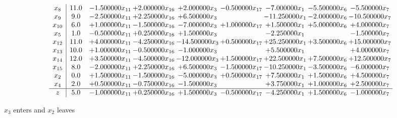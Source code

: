 \documentclass[10pt]{article}
\begin{document}
 \[\begin{array}{c| c c@{\hskip 2pt} c@{\hskip 2pt} c@{\hskip 2pt} c@{\hskip 2pt} c@{\hskip 2pt} c@{\hskip 2pt} c@{\hskip 2pt} }
 x_{8}   &  11.0 & -1.500000 x_{11} & + 2.000000 x_{16} & + 2.000000 x_{3} & -0.500000 x_{17} & -7.000000 x_{1} & -5.500000 x_{6} & -5.500000 x_{7}\\
 x_{9}   &  9.0 & -2.500000 x_{11} & + 2.250000 x_{16} & + 6.500000 x_{3} &   & -11.250000 x_{1} & -2.000000 x_{6} & -10.500000 x_{7}\\
 x_{10}   &  6.0 & + 1.000000 x_{11} & -1.500000 x_{16} & -7.000000 x_{3} & + 1.000000 x_{17} & + 1.500000 x_{1} & + 5.000000 x_{6} & + 4.000000 x_{7}\\
 x_{5}   &  1.0 & -0.500000 x_{11} & + 0.250000 x_{16} & + 1.500000 x_{3} &   & -2.250000 x_{1} &   & -1.500000 x_{7}\\
 x_{12}   &  11.0 & + 4.000000 x_{11} & -4.250000 x_{16} & -14.500000 x_{3} & + 0.500000 x_{17} & + 25.250000 x_{1} & + 3.500000 x_{6} & + 15.000000 x_{7}\\
 x_{13}   &  10.0 & + 1.000000 x_{11} & -0.500000 x_{16} & -1.000000 x_{3} &   & + 5.500000 x_{1} &   & + 4.000000 x_{7}\\
 x_{14}   &  12.0 & + 3.500000 x_{11} & -4.500000 x_{16} & -12.000000 x_{3} & + 1.500000 x_{17} & + 22.500000 x_{1} & + 7.500000 x_{6} & + 12.500000 x_{7}\\
 x_{15}   &  8.0 & -2.000000 x_{11} & + 2.250000 x_{16} & + 6.500000 x_{3} & -1.500000 x_{17} & -10.250000 x_{1} & -3.500000 x_{6} & -6.000000 x_{7}\\
 x_{2}   &  0.0 & + 1.500000 x_{11} & -1.500000 x_{16} & -5.000000 x_{3} & + 0.500000 x_{17} & + 7.500000 x_{1} & + 1.500000 x_{6} & + 4.500000 x_{7}\\
 x_{4}   &  2.0 & + 0.500000 x_{11} & -0.750000 x_{16} & -1.500000 x_{3} &   & + 3.750000 x_{1} & + 1.000000 x_{6} & + 2.500000 x_{7}\\
\hline
z    &  5.0 & -1.000000 x_{11} & + 0.250000 x_{16} & + 1.500000 x_{3} & -0.500000 x_{17} & -4.250000 x_{1} & + 1.500000 x_{6} & -1.000000 x_{7}\\
\end{array}\]


 $ x_{3} $ enters and $ x_{2} $ leaves 
\end{document}
